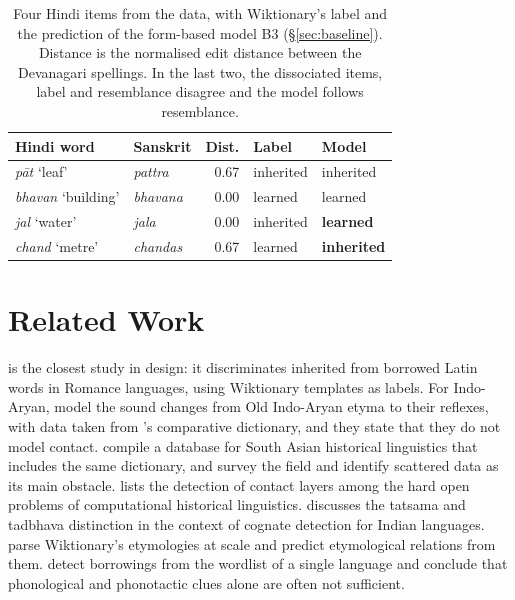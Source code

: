 \documentclass[11pt]{article}
\newcommand{\gl}[1]{`#1'}
\begin{document}
\begin{table}[t]
\centering\small
\setlength{\tabcolsep}{3pt}
\begin{tabular}{llrll}
\toprule
\textbf{Hindi word} & \textbf{Sanskrit} & \textbf{Dist.} & \textbf{Label} & \textbf{Model} \\
\midrule
\textit{p\=at} \gl{leaf} & \textit{pattra} & 0.67 & inherited & inherited \\
\textit{bhavan} \gl{building} & \textit{bhavana} & 0.00 & learned & learned \\
\midrule
\textit{jal} \gl{water} & \textit{jala} & 0.00 & inherited & \textbf{learned} \\
\textit{chand} \gl{metre} & \textit{chandas} & 0.67 & learned & \textbf{inherited} \\
\bottomrule
\end{tabular}
\caption{Four Hindi items from the data, with Wiktionary's label and the prediction of the form-based model B3 (\S\ref{sec:baseline}). Distance is the normalised edit distance between the Devanagari spellings. In the last two, the dissociated items, label and resemblance disagree and the model follows resemblance.}
\label{tab:examples}
\end{table}

\section{Related Work}

\citet{cristea2021inherited} is the closest study in design: it discriminates inherited from borrowed Latin words in Romance languages, using Wiktionary templates as labels. For Indo-Aryan, \citet{cathcart2020disentangling} model the sound changes from Old Indo-Aryan etyma to their reflexes, with data taken from \citeauthor{turner1966cdial}'s comparative dictionary, and they state that they do not model contact. \citet{arora2023jambu} compile a database for South Asian historical linguistics that includes the same dictionary, and \citet{arora2022computational} survey the field and identify scattered data as its main obstacle. \citet{list2024openproblems} lists the detection of contact layers among the hard open problems of computational historical linguistics. \citet[\S4.1]{kanojia2021thesis} discusses the tatsama and tadbhava distinction in the context of cognate detection for Indian languages. \citet{wu2020computational} parse Wiktionary's etymologies at scale and predict etymological relations from them. \citet{miller2020lexical} detect borrowings from the wordlist of a single language and conclude that phonological and phonotactic clues alone are often not sufficient.
\end{document}
